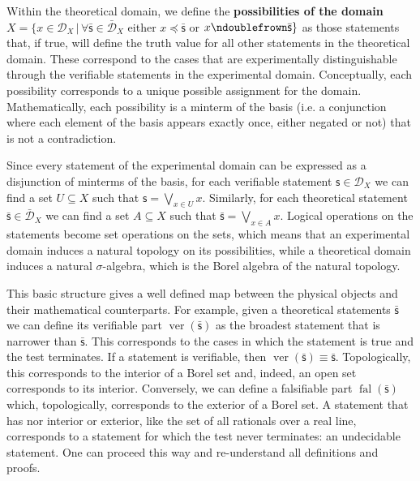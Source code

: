 \documentclass{article}
\def\bigOR{\bigvee}
\newcommand{\stmt}[1][s] {\mathsf{#1}} %
\newcommand{\tstmt}[1][s] {\bar{\mathsf{#1}}} %
\def\ncomp{\ndoublefrown}
\def\narrower{\preccurlyeq} %
\newcommand{\edomain}[1][D] {\mathcal{#1}} %
\newcommand{\tdomain}[1][D] {\bar{\mathcal{#1}}} %
\DeclareMathOperator{\ver}{ver}
\DeclareMathOperator{\fal}{fal}
\begin{document}
Within the theoretical domain, we define the  \textbf{possibilities of the domain} $X = \{ x \in \edomain_X \, | \, \forall \tstmt \in \tdomain_X $ either $x \narrower \tstmt$ or $x \ncomp \tstmt\}$ as those statements that, if true, will define the truth value for all other statements in the theoretical domain. These correspond to the cases that are experimentally distinguishable through the verifiable statements in the experimental domain. Conceptually, each possibility corresponds to a unique possible assignment for the domain. Mathematically, each possibility is a minterm of the basis (i.e. a conjunction where each element of the basis appears exactly once, either negated or not) that is not a contradiction.

Since every statement of the experimental domain can be expressed as a disjunction of minterms of the basis, for each verifiable statement $\stmt \in \edomain_X$ we can find a set $U \subseteq X$ such that $\stmt = \bigOR_{x \in U} x$. Similarly, for each theoretical statement $\tstmt \in \tdomain_X$ we can find a set $A \subseteq X$ such that $\tstmt = \bigOR_{x \in A} x$. Logical operations on the statements become set operations on the sets, which means that an experimental domain induces a natural topology on its possibilities, while a theoretical domain induces a natural $\sigma$-algebra, which is the Borel algebra of the natural topology.

This basic structure gives a well defined map between the physical objects and their mathematical counterparts. For example, given a theoretical statements $\tstmt$ we can define its verifiable part $\ver(\tstmt)$ as the broadest statement that is narrower than $\tstmt$. This corresponds to the cases in which the statement is true and the test terminates. If a statement is verifiable, then $\ver(\tstmt) \equiv \tstmt$. Topologically, this corresponds to the interior of a Borel set and, indeed, an open set corresponds to its interior. Conversely, we can define a falsifiable part $\fal(\tstmt)$ which, topologically, corresponds to the exterior of a Borel set. A statement that has nor interior or exterior, like the set of all rationals over a real line, corresponds to a statement for which the test never terminates: an undecidable statement. One can proceed this way and re-understand all definitions and proofs.
\end{document}
